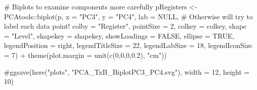 \documentclass[
  letterpaper,
  DIV=11,
  numbers=noendperiod]{scrreprt}
\newenvironment{Shaded}{\begin{snugshade}}{\end{snugshade}}
\newcommand{\AttributeTok}[1]{\textcolor[rgb]{0.40,0.45,0.13}{#1}}
\newcommand{\CommentTok}[1]{\textcolor[rgb]{0.37,0.37,0.37}{#1}}
\newcommand{\ConstantTok}[1]{\textcolor[rgb]{0.56,0.35,0.01}{#1}}
\newcommand{\DecValTok}[1]{\textcolor[rgb]{0.68,0.00,0.00}{#1}}
\newcommand{\FloatTok}[1]{\textcolor[rgb]{0.68,0.00,0.00}{#1}}
\newcommand{\FunctionTok}[1]{\textcolor[rgb]{0.28,0.35,0.67}{#1}}
\newcommand{\NormalTok}[1]{\textcolor[rgb]{0.00,0.23,0.31}{#1}}
\newcommand{\OtherTok}[1]{\textcolor[rgb]{0.00,0.23,0.31}{#1}}
\newcommand{\SpecialCharTok}[1]{\textcolor[rgb]{0.37,0.37,0.37}{#1}}
\newcommand{\StringTok}[1]{\textcolor[rgb]{0.13,0.47,0.30}{#1}}
\begin{document}
\begin{Shaded}
\begin{Highlighting}[]
\CommentTok{\# Biplots to examine components more carefully}
\NormalTok{pRegisters }\OtherTok{\textless{}{-}}\NormalTok{ PCAtools}\SpecialCharTok{::}\FunctionTok{biplot}\NormalTok{(p,}
                 \AttributeTok{x =} \StringTok{"PC3"}\NormalTok{,}
                 \AttributeTok{y =} \StringTok{"PC4"}\NormalTok{,}
                 \AttributeTok{lab =} \ConstantTok{NULL}\NormalTok{, }\CommentTok{\# Otherwise will try to label each data point!}
                 \AttributeTok{colby =} \StringTok{"Register"}\NormalTok{,}
                 \AttributeTok{pointSize =} \DecValTok{2}\NormalTok{,}
                 \AttributeTok{colkey =}\NormalTok{ colkey,}
                 \AttributeTok{shape =} \StringTok{"Level"}\NormalTok{,}
                 \AttributeTok{shapekey =}\NormalTok{ shapekey,}
                 \AttributeTok{showLoadings =} \ConstantTok{FALSE}\NormalTok{,}
                 \AttributeTok{ellipse =} \ConstantTok{TRUE}\NormalTok{,}
                 \AttributeTok{legendPosition =} \StringTok{\textquotesingle{}right\textquotesingle{}}\NormalTok{,}
                 \AttributeTok{legendTitleSize =} \DecValTok{22}\NormalTok{,}
                 \AttributeTok{legendLabSize =} \DecValTok{18}\NormalTok{, }
                 \AttributeTok{legendIconSize =} \DecValTok{7}\NormalTok{) }\SpecialCharTok{+}
  \FunctionTok{theme}\NormalTok{(}\AttributeTok{plot.margin =} \FunctionTok{unit}\NormalTok{(}\FunctionTok{c}\NormalTok{(}\DecValTok{0}\NormalTok{,}\DecValTok{0}\NormalTok{,}\DecValTok{0}\NormalTok{,}\FloatTok{0.2}\NormalTok{), }\StringTok{"cm"}\NormalTok{))}

\CommentTok{\#ggsave(here("plots", "PCA\_TxB\_BiplotPC3\_PC4.svg"), width = 12, height = 10)}


\end{Highlighting}
\end{Shaded}
\end{document}
